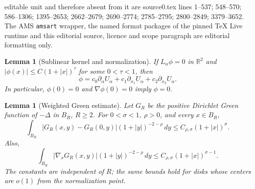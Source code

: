 \documentclass[10pt,a4paper]{amsart}
\numberwithin{equation}{section}
\newtheorem{lemma}[theorem]{Lemma}
\theoremstyle{definition}
\theoremstyle{remark}
\newcommand{\R}{\mathbb R}
\begin{document}
editable unit and therefore absent from it are source0.tex lines 1--537; 548--570; 586--1306; 1395--2653; 2662--2679; 2690--2774; 2785--2795; 2800--2849; 3379--3652. The AMS \texttt{amsart} wrapper, the named format packages of the pinned TeX Live runtime and this editorial source, licence and scope paragraph are editorial formatting only.\par\smallskip
\setcounter{section}{3}
\setcounter{equation}{4}
\setcounter{theorem}{0}
\begin{lemma}[Sublinear kernel and normalization]
\label{thm:linearized-classification}
If $L_\alpha\phi=0$ in $\R^2$ and
$|\phi(x)|\le C(1+|x|)^\tau$ for some $0<\tau<1$, then
\begin{equation}\label{eq:kernel-classification}
 \phi=c_0\partial_\alpha U_\alpha
       +c_1\partial_{x_1}U_\alpha+c_2\partial_{x_2}U_\alpha.
\end{equation}
In particular, $\phi(0)=0$ and $\nabla\phi(0)=0$ imply $\phi=0$.
\end{lemma}

\setcounter{section}{3}
\setcounter{equation}{7}
\setcounter{theorem}{1}
\begin{lemma}[Weighted Green estimate]\label{lem:weighted-green}
Let $G_R$ be the positive Dirichlet Green function of $-\Delta$ in
$B_R$, $R\ge2$. For $0<\sigma<1$, $\rho>0$, and every $x\in B_R$,
\begin{equation}\label{eq:weighted-green}
 \int_{B_R}|G_R(x,y)-G_R(0,y)|(1+|y|)^{-2-\rho}\,dy
 \le C_{\rho,\sigma}(1+|x|)^\sigma.
\end{equation}
Also,
\begin{equation}\label{eq:weighted-green-gradient}
 \int_{B_R}|\nabla_xG_R(x,y)|(1+|y|)^{-2-\rho}\,dy
 \le C_{\rho,\sigma}(1+|x|)^{\sigma-1}.
\end{equation}
The constants are independent of $R$; the same bounds hold for disks
whose centers are $o(1)$ from the normalization point.
\end{lemma}
\end{document}
